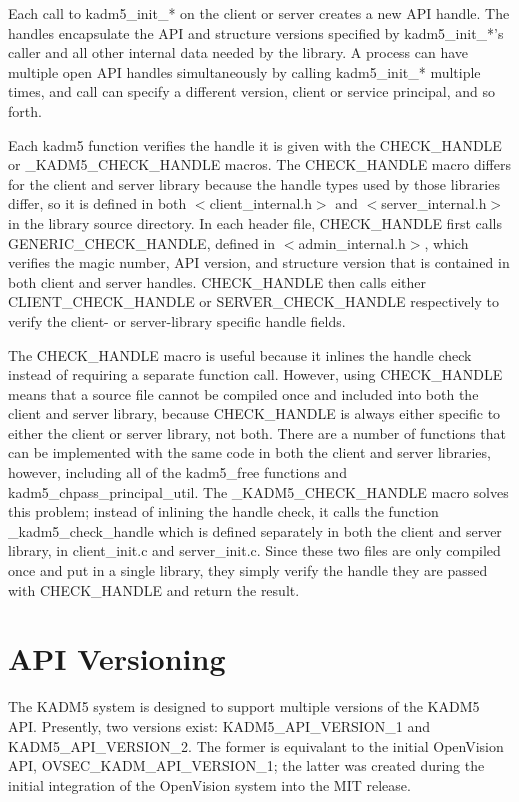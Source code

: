 Each call to kadm5_init_* on the client or server creates a new API
handle.  The handles encapsulate the API and structure versions
specified by kadm5_init_*'s caller and all other internal data needed
by the library.  A process can have multiple open API handles
simultaneously by calling kadm5_init_* multiple times, and call can
specify a different version, client or service principal, and so
forth.

Each kadm5 function verifies the handle it is given with the
CHECK_HANDLE or _KADM5_CHECK_HANDLE macros.  The CHECK_HANDLE macro
differs for the client and server library because the handle types
used by those libraries differ, so it is defined in both
$<$client_internal.h$>$ and $<$server_internal.h$>$ in the library
source directory.  In each header file, CHECK_HANDLE first calls
GENERIC_CHECK_HANDLE, defined in $<$admin_internal.h$>$, which
verifies the magic number, API version, and structure version that is
contained in both client and server handles.  CHECK_HANDLE then calls
either CLIENT_CHECK_HANDLE or SERVER_CHECK_HANDLE respectively to
verify the client- or server-library specific handle fields.

The CHECK_HANDLE macro is useful because it inlines the handle check
instead of requiring a separate function call.  However, using
CHECK_HANDLE means that a source file cannot be compiled once and
included into both the client and server library, because CHECK_HANDLE
is always either specific to either the client or server library, not
both.  There are a number of functions that can be implemented with
the same code in both the client and server libraries, however,
including all of the kadm5_free functions and
kadm5_chpass_principal_util.  The _KADM5_CHECK_HANDLE macro solves
this problem; instead of inlining the handle check, it calls the
function _kadm5_check_handle which is defined separately in both the
client and server library, in client_init.c and server_init.c.
Since these two files are only compiled once and put in a single
library, they simply verify the handle they are passed with
CHECK_HANDLE and return the result.

\section{API Versioning}

The KADM5 system is designed to support multiple versions of the KADM5
API.  Presently, two versions exist: KADM5_API_VERSION_1 and
KADM5_API_VERSION_2.  The former is equivalant to the initial
OpenVision API, OVSEC_KADM_API_VERSION_1; the latter was created
during the initial integration of the OpenVision system into the MIT
release.

